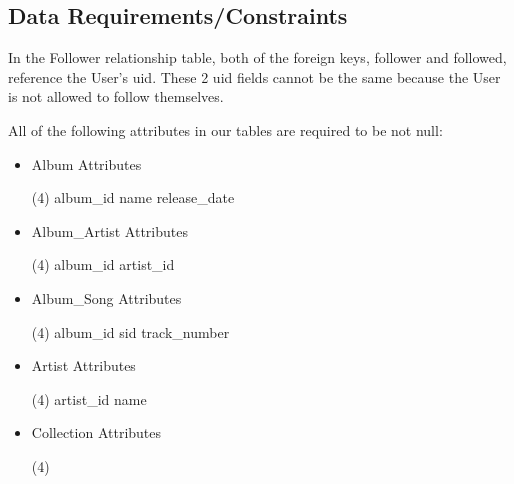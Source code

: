 \documentclass[12pt]{article}
\begin{document}
    \subsection{Data Requirements/Constraints}
    In the Follower relationship table, both of the foreign keys, follower and followed, reference the User's uid. These 2 uid fields cannot be the same because the User is not allowed to follow themselves.

    \vspace{0.5cm}

    \noindent All of the following attributes in our tables are required to be not null:

    \begin{itemize}
        \item Album Attributes
            \begin{tasks}[style=itemize, column-sep= 25mm, label-align=left, label-offset={2mm}, label-width={3mm}, item-indent={10mm}](4)
                \task[$-$] album\_id
                \task[$-$] name
                \task[$-$] release\_date
            \end{tasks}
        \item Album\_Artist Attributes
            \begin{tasks}[style=itemize, column-sep= 25mm, label-align=left, label-offset={2mm}, label-width={3mm}, item-indent={10mm}](4)
                \task[$-$] album\_id
                \task[$-$] artist\_id
            \end{tasks}
        \item Album\_Song Attributes
            \begin{tasks}[style=itemize, column-sep= 25mm, label-align=left, label-offset={2mm}, label-width={3mm}, item-indent={10mm}](4)
                \task[$-$] album\_id
                \task[$-$] sid
                \task[$-$] track\_number
            \end{tasks}
        \item Artist Attributes
            \begin{tasks}[style=itemize, column-sep= 25mm, label-align=left, label-offset={2mm}, label-width={3mm}, item-indent={10mm}](4)
                \task[$-$] artist\_id
                \task[$-$] name
            \end{tasks}
        \item Collection Attributes
            \begin{tasks}[style=itemize, column-sep= 25mm, label-align=left, label-offset={2mm}, label-width={3mm}, item-indent={10mm}](4)

\end{tasks}
\end{itemize}
\end{document}
